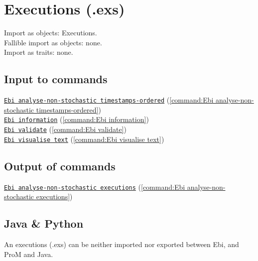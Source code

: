 {\section{Executions (.exs)}
\label{filehandler:executions}
Import as objects: Executions.
\\Fallible import as objects: none.
\\Import as traits: none.
\subsection*{Input to commands} \null\qquad\hyperref[command:Ebi analyse-non-stochastic timestamps-ordered]{\texttt{Ebi analyse-non-stochastic timestamps-ordered}} (\cref{command:Ebi analyse-non-stochastic timestamps-ordered})\\\null\qquad\hyperref[command:Ebi information]{\texttt{Ebi information}} (\cref{command:Ebi information})\\\null\qquad\hyperref[command:Ebi validate]{\texttt{Ebi validate}} (\cref{command:Ebi validate})\\\null\qquad\hyperref[command:Ebi visualise text]{\texttt{Ebi visualise text}} (\cref{command:Ebi visualise text})
\subsection*{Output of commands} \null\qquad\hyperref[command:Ebi analyse-non-stochastic executions]{\texttt{Ebi analyse-non-stochastic executions}} (\cref{command:Ebi analyse-non-stochastic executions})
\subsection*{Java \& Python}
An executions (.exs) can be neither imported nor exported between Ebi, and ProM and Java.
}
